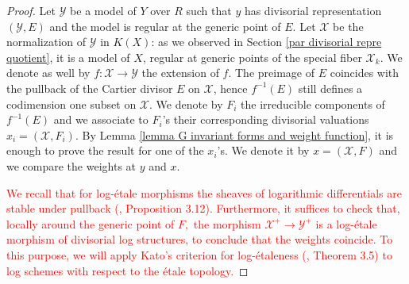\documentclass{amsart}%
\numberwithin{equation}{subsection}
\theoremstyle{plain2}
\theoremstyle{definition2}
\theoremstyle{stepstyle}
\theoremstyle{point}
\theoremstyle{subpoint}
\newcommand{\cX}{\ensuremath{\mathscr{X}}}
\newcommand{\cY}{\ensuremath{\mathscr{Y}}}
\renewcommand{\cY}{\ensuremath{\mathscr{Y}}}
\newcommand{\divisor}{\mathrm{div}}
\newcommand{\weight}{\mathrm{wt}}
\begin{document}
\begin{proof}
Let $\cY$ be a model of $Y$ over $R$ such that $y$ has divisorial representation $(\cY,E)$ and the model is regular at the generic point of $E$. Let $\cX$ be the normalization of $\cY$ in $K(X)$: as we observed in Section \ref{par divisorial repre quotient}, it is a model of $X$, regular at generic points of the special fiber $\cX_k$. We denote as well by $f:\cX \rightarrow \cY$ the extension of $f$. The preimage of $E$ coincides with the pullback of the Cartier divisor $E$ on $\cX$, hence $f^{-1}(E)$ still defines a codimension one subset on $\cX$. We denote by $F_i$ the irreducible components of $f^{-1}(E)$ and we associate to $F_i$'s their corresponding divisorial valuations $x_i=(\cX,F_i)$. By Lemma \ref{lemma G invariant forms and weight function}, it is enough to prove the result for one of the $x_i$'s. We denote it by $x = (\cX,F)$ and we compare the weights at $y$ and $x$.


\textcolor{red}{We recall that for log-\'{e}tale morphisms the sheaves of logarithmic differentials are stable under pullback (\cite{Kato1994a}, Proposition 3.12). Furthermore, it suffices to check that, locally around the generic point of $F,$ the morphism $\cX^+ \rightarrow \cY^+$ is a log-\'{e}tale morphism of divisorial log structures, to conclude that the weights coincide. To this purpose, we will apply Kato's criterion for log-\'{e}taleness (\cite{Kato1989}, Theorem 3.5) to log schemes with respect to the \'{e}tale topology.}


\end{proof}
\end{document}
